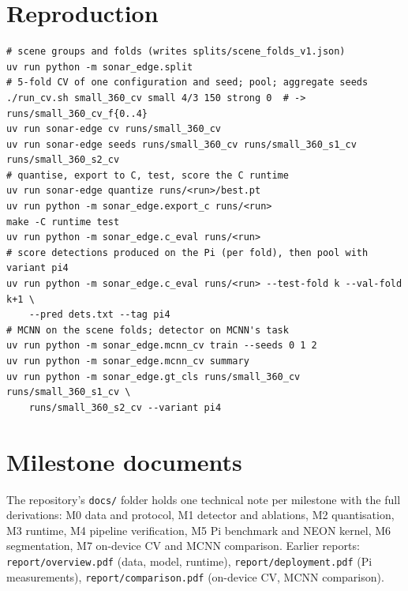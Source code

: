 \documentclass[11pt,a4paper]{article}
\begin{document}
\appendix
\section{Reproduction}
\label{app:repro}

\begin{small}
\begin{verbatim}
# scene groups and folds (writes splits/scene_folds_v1.json)
uv run python -m sonar_edge.split
# 5-fold CV of one configuration and seed; pool; aggregate seeds
./run_cv.sh small_360_cv small 4/3 150 strong 0  # -> runs/small_360_cv_f{0..4}
uv run sonar-edge cv runs/small_360_cv
uv run sonar-edge seeds runs/small_360_cv runs/small_360_s1_cv runs/small_360_s2_cv
# quantise, export to C, test, score the C runtime
uv run sonar-edge quantize runs/<run>/best.pt
uv run python -m sonar_edge.export_c runs/<run>
make -C runtime test
uv run python -m sonar_edge.c_eval runs/<run>
# score detections produced on the Pi (per fold), then pool with variant pi4
uv run python -m sonar_edge.c_eval runs/<run> --test-fold k --val-fold k+1 \
    --pred dets.txt --tag pi4
# MCNN on the scene folds; detector on MCNN's task
uv run python -m sonar_edge.mcnn_cv train --seeds 0 1 2
uv run python -m sonar_edge.mcnn_cv summary
uv run python -m sonar_edge.gt_cls runs/small_360_cv runs/small_360_s1_cv \
    runs/small_360_s2_cv --variant pi4
\end{verbatim}
\end{small}

\section{Milestone documents}

The repository's \texttt{docs/} folder holds one technical note per
milestone with the full derivations: M0 data and protocol, M1 detector and
ablations, M2 quantisation, M3 runtime, M4 pipeline verification, M5 Pi
benchmark and NEON kernel, M6 segmentation, M7 on-device CV and MCNN
comparison. Earlier reports: \texttt{report/overview.pdf} (data, model,
runtime), \texttt{report/deployment.pdf} (Pi measurements),
\texttt{report/comparison.pdf} (on-device CV, MCNN comparison).
\end{document}
